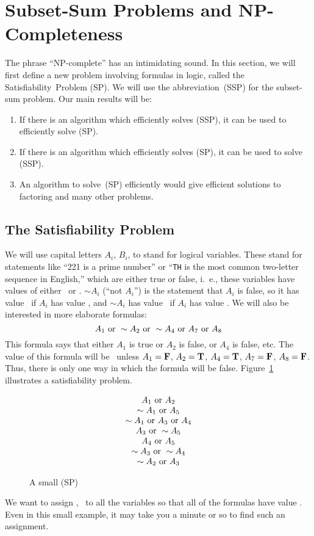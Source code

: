 \section{Subset-Sum Problems and NP-Completeness\label{NP}}
The phrase ``NP-complete'' has an intimidating sound. In this 
section, we will first define a new problem involving formulas
in logic, called the Satisfiability~Problem (SP).  We will use
the abbreviation~(SSP) for the subset-sum problem.  Our main
results will be:\begin{enumerate}\item If there is an algorithm
which efficiently solves (SSP), it can be used to efficiently
solve (SP).\item If there is an algorithm which efficiently
solves (SP), it can be used to solve (SSP).\item An algorithm
to solve~(SP) efficiently would give efficient solutions to
factoring and many other problems.\end{enumerate}
\subsection{The Satisfiability Problem}We will use capital\label{SP}
letters $A_i$, $B_i$, to stand for logical variables. These
stand for statements like ``221 is a prime number'' or
``{\tt TH} is the most common two-letter sequence in English,''
which are either true or false, i.~e., these variables have
values of either \T\ or \F. $\sim A_i$ (``not $A_i$'') is the
statement that $A_i$ is false, so it has value \T\ if $A_i$ has
value \F, and $\sim A_i$ has value \F\ if $A_i$ has value \T.
We will also be interested in more elaborate formulas:
$$A_1\hbox{ or }\sim A_2\hbox{ or }\sim A_4\hbox{ or } A_7\hbox{ or } A_8$$
This formula says that either $A_1$ is true or $A_2$ is false, or
$A_4$ is false, etc.  The value of this formula will be \T\ unless
$A_1={\bf F}$, $A_2={\bf T}$, $A_4={\bf T}$, $A_7={\bf F}$, $A_8={\bf F}$.  Thus, there is only
one way in which the formula will be false.
\pq Figure~\ref{EP} illustrates a  satisfiability problem.
\begin{figure}[ht]
$$\begin{array}{c}A_1\hbox{ or } A_2\\ \sim A_1\hbox{ or } A_5\\ \sim A_1 \hbox{ or } A_3
\hbox{ or } A_4\\A_3\hbox{ or }\sim A_5\\A_4\hbox{ or } A_5\\ \sim A_3\hbox{ or }\sim A_4\\
\sim A_2\hbox{ or } A_3\end{array}$$\caption{A small (SP)\label{EP}}\end{figure}
We want to assign \T, \F\ to all the variables so that
all of the formulas have value \T. Even in this small example, it 
may take you a minute or so to find such an assignment.
